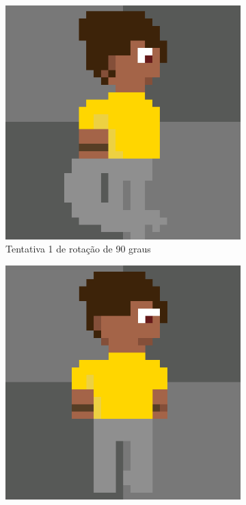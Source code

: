 \begin{figure}[htbp]
\begin{subfigure}{0.35\linewidth}
        \includegraphics[width=1\linewidth]{figs/pixelLab/dia2/rot45fix3res1.PNG}
        \caption{\small Tentativa 1 de rotação de 90 graus}
        \label{fig:pixelLabRot8b}
    \end{subfigure}
    \begin{subfigure}{0.35\linewidth}
        \includegraphics[width=1\linewidth]{figs/pixelLab/dia2/rot45fix3res2.PNG}

\end{subfigure}
\end{figure}
